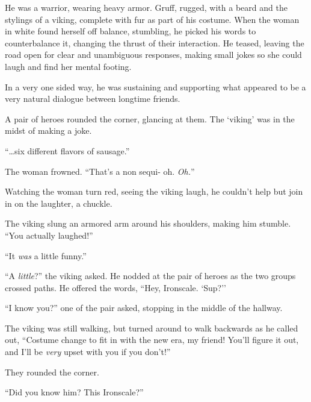 He was a warrior, wearing heavy armor.  Gruff, rugged, with a beard and the stylings of a viking, complete with fur as part of his costume.  When the woman in white found herself off balance, stumbling, he picked his words to counterbalance it, changing the thrust of their interaction.  He teased, leaving the road open for clear and unambiguous responses, making small jokes so she could laugh and find her mental footing.



In a very one sided way, he was sustaining and supporting what appeared to be a very natural dialogue between longtime friends.



A pair of heroes rounded the corner, glancing at them.  The `viking' was in the midst of making a joke.



``\ldots{}six different flavors of sausage.''



The woman frowned.  ``That's a non sequi-  oh.  \emph{Oh.}''



Watching the woman turn red, seeing the viking laugh, he couldn't help but join in on the laughter, a chuckle.



The viking slung an armored arm around his shoulders, making him stumble.  ``You actually laughed!''



``It \emph{was} a little funny.''



``A \emph{little}?''  the viking asked.  He nodded at the pair of heroes as the two groups crossed paths.  He offered the words, ``Hey, Ironscale.  `Sup?''



``I know you?'' one of the pair asked, stopping in the middle of the hallway.



The viking was still walking, but turned around to walk backwards as he called out, ``Costume change to fit in with the new era, my friend!  You'll figure it out, and I'll be \emph{very} upset with you if you don't!''



They rounded the corner.



``Did you know him?  This Ironscale?''



